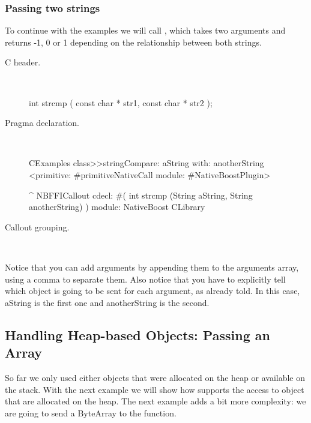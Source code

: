 \documentclass[a4paper,10pt,twoside]{book}
\begin{document}
\subsubsection{Passing two strings}
To continue with the examples we will call , which takes
two arguments and returns -1, 0 or 1 depending on the relationship
between both strings.

\begin{description}
\item [C header.] \ 

\begin{code}{}
int strcmp ( const char * str1, const char * str2 );
\end{code}

\item [Pragma declaration.] \ 

\begin{code}{}
CExamples class>>stringCompare: aString with: anotherString
	<primitive: #primitiveNativeCall module: #NativeBoostPlugin>
	
	^ NBFFICallout cdecl: #( int strcmp (String aString, String anotherString) ) module: NativeBoost CLibrary
\end{code}


\item [Callout grouping.] \ 
 

\end{description}

Notice that you can add arguments by appending them to the arguments array,
using a comma to separate them. Also notice that you have to explicitly tell
which object is going to be sent for each argument, as already told. In this
case, aString is the first one and anotherString is the second.



\subsection{Handling Heap-based Objects: Passing an Array}
So far we only used either objects that were allocated on the heap or available on the stack. 
With the next example we will show how \Spock supports the access to object that are allocated on the heap.
The next example adds a bit more complexity: we are going to send a ByteArray
to the  function. 
\end{document}

